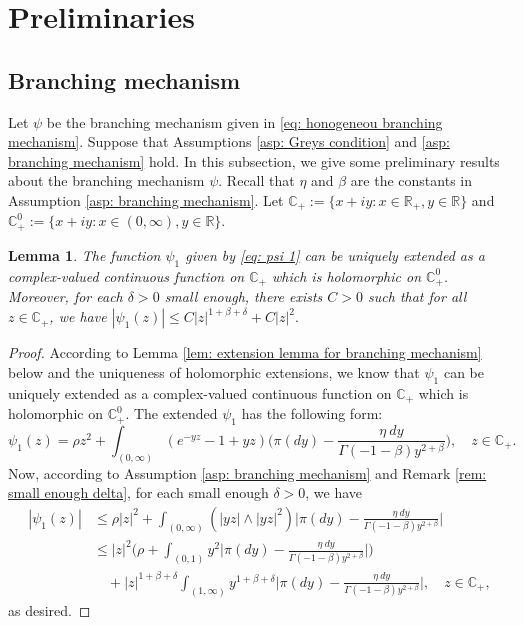 \documentclass[12pt,a4paper]{amsart}
\theoremstyle{plain}
\newtheorem{lem}[thm]{Lemma}
\theoremstyle{definition}
\numberwithin{equation}{section}
\begin{document}
\section{Preliminaries}
\subsection{Branching mechanism}
\label{sec: branching mechanism}
Let $\psi$ be the branching mechanism given in \eqref{eq: honogeneou branching mechanism}.
Suppose that Assumptions \ref{asp: Greys condition} and \ref{asp: branching mechanism} hold.
In this subsection, we give some preliminary results about the branching mechanism $\psi$.
Recall that $\eta$ and $\beta$ are the constants in Assumption \ref{asp: branching mechanism}.
Let $\mathbb C_+:= \{x+iy: x\in \mathbb R_+, y \in \mathbb R\}$ and $\mathbb C^0_+:= \{x+iy: x\in (0,\infty), y \in \mathbb R\}$.
\begin{lem}
  \label{lem: complex extension for psi1}
	The function $\psi_1$ given by \eqref{eq: psi 1} can be uniquely extended as a complex-valued continuous function on $\mathbb C_+$ which is holomorphic on $\mathbb C^0_+$.
  Moreover, for each $\delta > 0$ small enough, there exists $C>0$ such that for all $z\in \mathbb C_+$, we have
  $
	|\psi_1(z)| \leq C |z|^{1+\beta+\delta} + C|z|^2.
  $
\end{lem}
\begin{proof}
  According to Lemma \ref{lem: extension lemma for branching mechanism} below and the uniqueness of holomorphic extensions,
	we know that $\psi_1$ can be uniquely extended as a complex-valued continuous function on $\mathbb C_+$ which is holomorphic on $\mathbb C^0_+$.
	The extended $\psi_1$ has the following form:
  \[
    \psi_1(z)
    = \rho z^2 + \int_{(0,\infty)}(e^{-yz}-1+yz) \Big(\pi(dy) - \frac {\eta~dy} {\Gamma(-1-\beta)y^{2+\beta}} \Big)
    , \quad z\in \mathbb C_+.
  \]
	Now, according to  Assumption \ref{asp: branching mechanism} and Remark \ref{rem: small enough delta}, for each small enough $\delta > 0$, we have
  \begin{align}
    |\psi_1(z)|
    & \leq \rho |z|^2 + \int_{(0,\infty)} (|yz|\wedge |yz|^2) \Big|\pi(dy) - \frac{\eta~dy}{\Gamma(-1-\beta)y^{2+\beta}}\Big| \\
    & \leq  |z|^2 \Big(\rho + \int_{(0,1)} y^2 \Big|\pi(dy) - \frac{\eta~dy}{\Gamma(-1-\beta)y^{2+\beta}}\Big|\Big) \\
    & \quad + |z|^{1+\beta +\delta}\int_{(1,\infty)} y^{1+\beta + \delta} \Big|\pi(dy) - \frac{\eta~dy}{\Gamma(-1-\beta)y^{2+\beta}}\Big|,
      \quad z \in \mathbb C_+,
  \end{align}
	as desired.
\end{proof}
\end{document}
